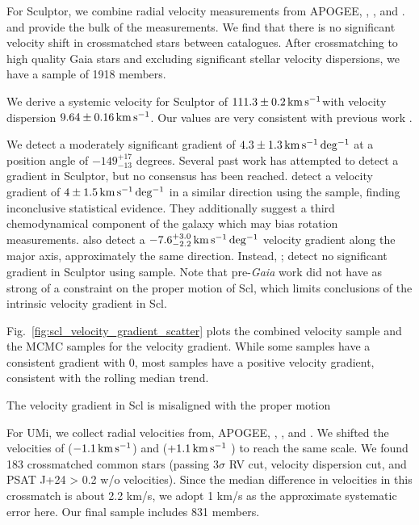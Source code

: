 For Sculptor, we combine radial velocity measurements from APOGEE,
\citet{sestito+2023a}, \citet{tolstoy+2023}, and \citet{WMO2009}.
\citet{tolstoy+2023} and \citet{WMO2009} provide the bulk of the
measurements. We find that there is no significant velocity shift in
crossmatched stars between catalogues. After crossmatching to high
quality Gaia stars and excluding significant stellar velocity
dispersions, we have a sample of 1918 members.

We derive a systemic velocity for Sculptor of \(111.3\pm0.2\,{\rm km\,s^{-1}}\)with
velocity dispersion \(9.64\pm0.16\,{\rm km\,s^{-1}}\). Our values are very
consistent with previous work \citep[e.g.][\citet{arroyo-polonio+2024},
\citet{battaglia+2008}]{walker+2009}.

We detect a moderately significant gradient of \(4.3\pm1.3\,{\rm km\,s^{-1}\,deg^{-1}}\) at
a position angle of \(-149_{-13}^{+17}\) degrees. Several past work has
attempted to detect a gradient in Sculptor, but no consensus has been
reached. \citet{arroyo-polonio+2024} detect a velocity gradient of
\(4\pm1.5\,{\rm km\,s^{-1}\,deg^{-1}}\) in a similar direction using the
\citet{tolstoy+2023} sample, finding inconclusive statistical evidence.
They additionally suggest a third chemodynamical component of the galaxy
which may bias rotation measurements. \citet{battaglia+2008} also detect
a \(-7.6_{-2.2}^{+3.0}\,{\rm km\,s^{-1}\,deg^{-1}}\) velocity gradient along the major
axis, approximately the same direction. Instead, \citet{strigari2010};
\citet{martinez-garcia+2023} detect no significant gradient in Sculptor
using \citet{WMO2009} sample. Note that pre-\emph{Gaia} work did not
have as strong of a constraint on the proper motion of Scl, which limits
conclusions of the intrinsic velocity gradient in Scl.

Fig.~\ref{fig:scl_velocity_gradient_scatter} plots the combined velocity
sample and the MCMC samples for the velocity gradient. While some
samples have a consistent gradient with 0, most samples have a positive
velocity gradient, consistent with the rolling median trend.

The velocity gradient in Scl is misaligned with the proper motion

For UMi, we collect radial velocities from, APOGEE,
\citet{sestito+2023b}, \citet{pace+2020}, and \citet{spencer+2018}. We
shifted the velocities of \citet{spencer+2018} (\(-1.1\,{\rm km\,s^{-1}}\)) and
\citet{pace+2020} (\(+1.1\,{\rm km\,s^{-1}}\) ) to reach the same scale. We found
183 crossmatched common stars (passing 3\(\sigma\) RV cut, velocity
dispersion cut, and PSAT J+24 \textgreater{} 0.2 w/o velocities). Since
the median difference in velocities in this crossmatch is about 2.2
km/s, we adopt 1 km/s as the approximate systematic error here. Our
final sample includes 831 members.

